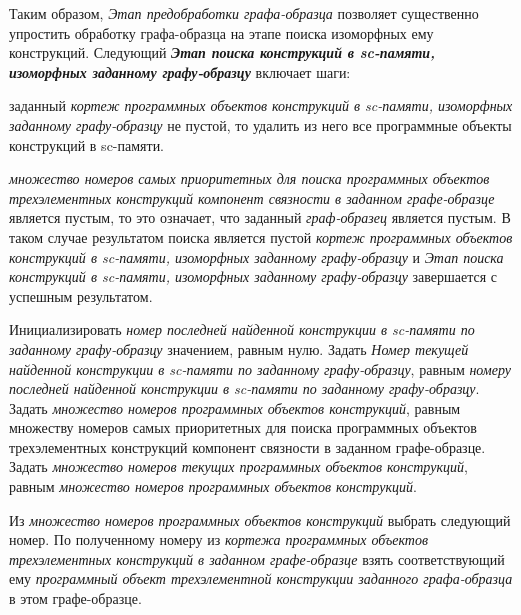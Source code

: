 Таким образом, \textit{Этап предобработки графа-образца} позволяет существенно упростить обработку графа-образца на этапе поиска изоморфных ему конструкций. Следующий \textbf{\textit{Этап поиска конструкций в sc-памяти, изоморфных заданному графу-образцу}} включает  шаги:
\begin{textitemize}
	\item {} заданный \textit{кортеж программных объектов конструкций в sc-памяти, изоморфных заданному графу-образцу} не пустой, то удалить из него все программные объекты конструкций в sc-памяти.
	\item {} \textit{множество номеров самых приоритетных для поиска программных объектов трехэлементных конструкций компонент связности в заданном графе-образце} является пустым, то это означает, что заданный \textit{граф-образец} является пустым. В таком случае результатом поиска является пустой \textit{кортеж программных объектов конструкций в sc-памяти, изоморфных заданному графу-образцу} и \textit{Этап поиска конструкций в sc-памяти, изоморфных заданному графу-образцу} завершается с успешным результатом.
	\item Инициализировать \textit{номер последней найденной конструкции в sc-памяти по заданному графу-образцу} значением, равным нулю. Задать \textit{Номер текущей найденной конструкции в sc-памяти по заданному графу-образцу}, равным \textit{номеру последней найденной конструкции в sc-памяти по заданному графу-образцу}. Задать \textit{множество номеров  программных объектов конструкций}, равным {множеству номеров самых приоритетных для поиска программных объектов трехэлементных конструкций компонент связности в заданном графе-образце}. Задать \textit{множество номеров текущих программных объектов конструкций}, равным \textit{множество номеров  программных объектов конструкций}.
	\item Из \textit{множество номеров  программных объектов конструкций} выбрать следующий номер. По полученному номеру из \textit{кортежа программных объектов трехэлементных конструкций в заданном графе-образце} взять соответствующий ему \textit{программный объект трехэлементной конструкции заданного графа-образца} в этом графе-образце.

\end{textitemize}
